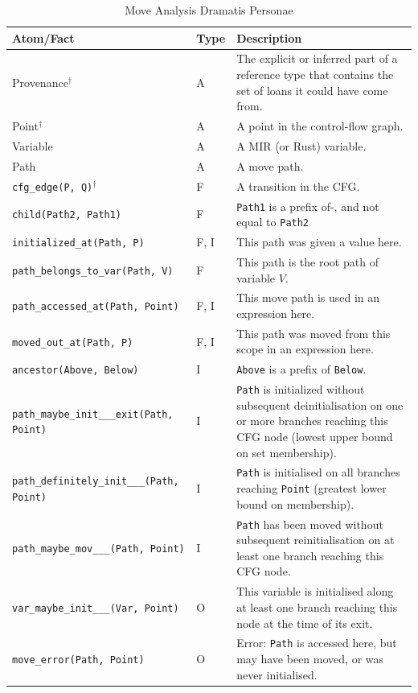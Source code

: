 \documentclass[11pt,a4paper,twoside,openany,draft]{report}
\newcommand{\notmine}[0] {$^\dagger$}
\newcommand{\InDatalog}[1]{\texttt{#1}}
\begin{document}
{ \renewcommand{\arraystretch}{1.0}
\begin{table}[!htbp]
  \begin{tabular}{@{}l l m{5.5cm}}
    Atom/Fact & Type & Description \\ \toprule
    Provenance\notmine{} & A & The explicit or inferred part of a reference type that contains the set of loans it could have come from.  \\
    Point\notmine{} & A & A point in the control-flow graph. \\
    Variable & A & A MIR (or Rust) variable. \\
    Path & A & A move path. \\
    \InDatalog{cfg_edge(P, Q)}\notmine{} & F & A transition in the CFG\@. \\
    \InDatalog{child(Path2, Path1)} & F & \InDatalog{Path1} is a prefix of-, and not equal to \InDatalog{Path2}  \\
    \InDatalog{initialized_at(Path, P)} & F, I & This path was given a value here. \\
    \InDatalog{path_belongs_to_var(Path, V)} & F & This path is the root path of variable $V$. \\
    \InDatalog{path_accessed_at(Path, Point)} & F, I & This move path is used in an expression here.\\
    \InDatalog{moved_out_at(Path, P)} & F, I & This path was moved from this scope in an expression here. \\
    \InDatalog{ancestor(Above, Below)} & I & \InDatalog{Above} is a prefix of \InDatalog{Below}.\\
    \InDatalog{path_maybe_init___exit(Path, Point)} & I & \InDatalog{Path} is initialized without subsequent deinitialisation on one or more branches reaching this CFG node (lowest upper bound on set membership).\\
    \InDatalog{path_definitely_init___(Path, Point)} & I &  \InDatalog{Path} is initialised on all branches reaching \InDatalog{Point} (greatest lower bound on membership). \\
    \InDatalog{path_maybe_mov___(Path, Point)} & I & \InDatalog{Path} has been moved without subsequent reinitialisation on at least one branch reaching this CFG node. \\
    \InDatalog{var_maybe_init___(Var, Point)} & O & This variable is initialised along at least one branch reaching this node at the time of its exit. \\
    \InDatalog{move_error(Path, Point)} & O & Error: \InDatalog{Path} is accessed here, but may have been moved, or was never initialised. \\
  \end{tabular}
\caption{Move Analysis Dramatis Personae}\label{tab:move-facts-recap}
\end{table}%
}
\end{document}
